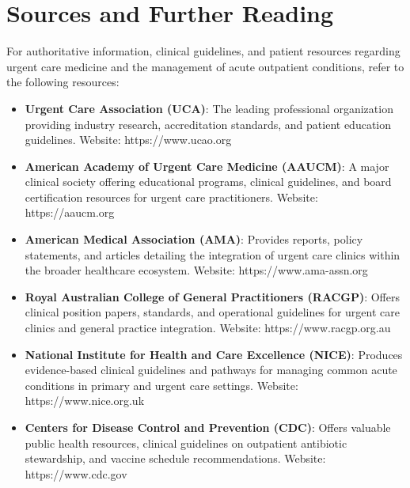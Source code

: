 \section*{Sources and Further Reading}
For authoritative information, clinical guidelines, and patient resources regarding urgent care medicine and the management of acute outpatient conditions, refer to the following resources:

\begin{itemize}
  \item \textbf{Urgent Care Association (UCA)}: The leading professional organization providing industry research, accreditation standards, and patient education guidelines. Website: https://www.ucao.org
  \item \textbf{American Academy of Urgent Care Medicine (AAUCM)}: A major clinical society offering educational programs, clinical guidelines, and board certification resources for urgent care practitioners. Website: https://aaucm.org
  \item \textbf{American Medical Association (AMA)}: Provides reports, policy statements, and articles detailing the integration of urgent care clinics within the broader healthcare ecosystem. Website: https://www.ama-assn.org
  \item \textbf{Royal Australian College of General Practitioners (RACGP)}: Offers clinical position papers, standards, and operational guidelines for urgent care clinics and general practice integration. Website: https://www.racgp.org.au
  \item \textbf{National Institute for Health and Care Excellence (NICE)}: Produces evidence-based clinical guidelines and pathways for managing common acute conditions in primary and urgent care settings. Website: https://www.nice.org.uk
  \item \textbf{Centers for Disease Control and Prevention (CDC)}: Offers valuable public health resources, clinical guidelines on outpatient antibiotic stewardship, and vaccine schedule recommendations. Website: https://www.cdc.gov
\end{itemize}
